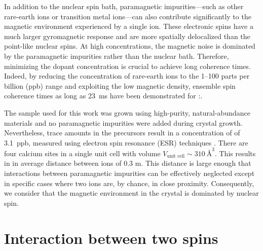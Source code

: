 In addition to the nuclear spin bath, paramagnetic impurities—such as other rare-earth ions or transition metal ions—can also contribute significantly to the magnetic environment experienced by a single \Er ion. These electronic spins have a much larger gyromagnetic response and are more spatially delocalized than the point-like nuclear spins. At high concentrations, the magnetic noise is dominated by the paramagnetic impurities rather than the nuclear bath. Therefore, minimizing the dopant concentration is crucial to achieve long coherence times. Indeed, by reducing the concentration of rare-earth ions to the 1--100 parts per billion (ppb) range and exploiting the low magnetic density, ensemble spin coherence times as long as 23~ms have been demonstrated for \Er:\Ca {}.

The sample used for this work was grown using high-purity, natural-abundance materials and no paramagnetic impurities were added during crystal growth. Nevertheless, trace amounts in the precursors result in a concentration of \Er of 3.1~ppb, measured using electron spin resonance (ESR) techniques . There are four calcium sites in a single unit cell with volume $V_{\text{unit cell}}\sim310\ \text{\AA}^3$. This results in in average distance between ions of 0.3 \textmu m.  
This distance is large enough that interactions between paramagnetic impurities can be effectively neglected except in specific cases where two ions are, by chance, in close proximity. Consequently, we consider that the magnetic environment in the crystal is dominated by \W nuclear spin.

\section{Interaction between two spins}

